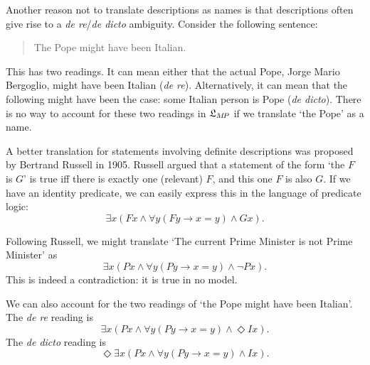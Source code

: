 Another reason not to translate descriptions as names is that descriptions often
give rise to a \emph{de re}/\emph{de dicto} ambiguity. Consider the following
sentence:
\begin{quote}
  The Pope might have been Italian.
\end{quote}
This has two readings. It can mean either that the actual Pope, Jorge Mario
Bergoglio, might have been Italian (\emph{de re}). Alternatively, it can mean
that the following might have been the case: some Italian person is Pope
(\emph{de dicto}). There is no way to account for these two readings in
$\mathfrak{L}_{M\!P}$ if we translate `the Pope' as a name. 

A better translation for statements involving definite descriptions was proposed
by Bertrand Russell in 1905. Russell argued that a statement of the form `the
$F$ is $G$' is true iff there is exactly one (relevant) $F$, and
this one $F$ is also $G$. If we have an identity predicate, we can easily
express this in the language of predicate logic:
\[
  \exists x(Fx \land \forall y(Fy \to x\!=\!y) \land Gx). 
\]

Following Russell, we might translate `The current Prime Minister is not Prime
Minister' as
\[
  \exists x(Px \land \forall y(Py \to x\!=\!y) \land \neg Px).
\]
This is indeed a contradiction: it is true in no model.

We can also account for the two readings of `the Pope might have been Italian'.
The \emph{de re} reading is
\[
  \exists x (Px \land \forall y(Py \to x\!=\!y) \land \Diamond Ix).
\]
The \emph{de dicto} reading is
\[
  \Diamond \exists x (Px \land \forall y(Py \to x\!=\!y) \land Ix).
\]


